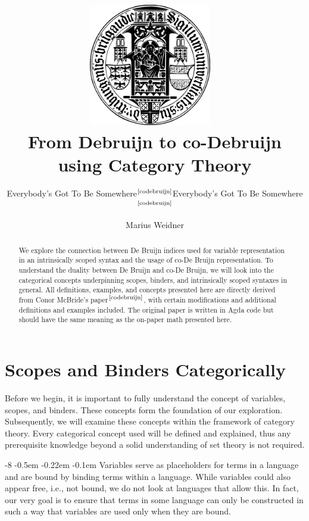 \documentclass[runningheads]{llncs}
\subtitle{Everybody's Got To Be Somewhere$^{\text{\cite{codebruijn}}}$}
\title{\includegraphics[width=0.4\textwidth]{seal.png}~\\[1cm] From Debruijn to co-Debruijn using Category Theory}
\subtitle{Everybody's Got To Be Somewhere$^{\text{\cite{codebruijn}}}$}
\institute{Chair of Programming Languages, University of Freiburg \\
  \email{weidner@cs.uni-freiburg.de}}
\author{Marius Weidner}
\begin{document}
\let\oldaddcontentsline\addcontentsline{}
\def\addcontentsline#1#2#3{}
\maketitle
\def\addcontentsline#1#2#3{\oldaddcontentsline{#1}{#2}{#3}}

\makeatletter
\renewcommand\subsubsection{\@startsection{subsubsection}{3}{\z@}%
                       {-8\p@ \@plus -4\p@ \@minus -4\p@}%
                       {-0.5em \@plus -0.22em \@minus -0.1em}%
                       {\normalfont\normalsize\bfseries\boldmath}}
\makeatother

\begin{abstract}
  We explore the connection between De Bruijn indices used for variable representation in an intrinsically scoped syntax and the usage of co-De Bruijn representation. 
  To understand the duality between De Bruijn and co-De Bruijn, we will look into the categorical concepts underpinning scopes, binders, and intrinsically scoped syntaxes in general. 
  All definitions, examples, and concepts presented here are directly derived from Conor McBride's paper$^{\text{\cite{codebruijn}}}$, with certain modifications and additional definitions and examples included. 
  The original paper is written in Agda code but should have the same meaning as the on-paper math presented here. 
\end{abstract}

\setcounter{tocdepth}{2}
\tableofcontents

\section{Scopes and Binders Categorically}
Before we begin, it is important to fully understand the concept of variables, scopes, and binders. These concepts form the foundation of our exploration.
Subsequently, we will examine these concepts within the framework of category theory. 
Every categorical concept used will be defined and explained, thus any prerequisite knowledge beyond a solid understanding of set theory is not required.

\subsubsection{Variables}
serve as placeholders for terms in a language and are bound by binding terms within a language. 
While variables could also appear free, i.e., not bound, we do not look at languages that allow this. 
In fact, our very goal is to ensure that terms in some language can only be constructed in such a way that variables are used only when they are bound.
\end{document}

